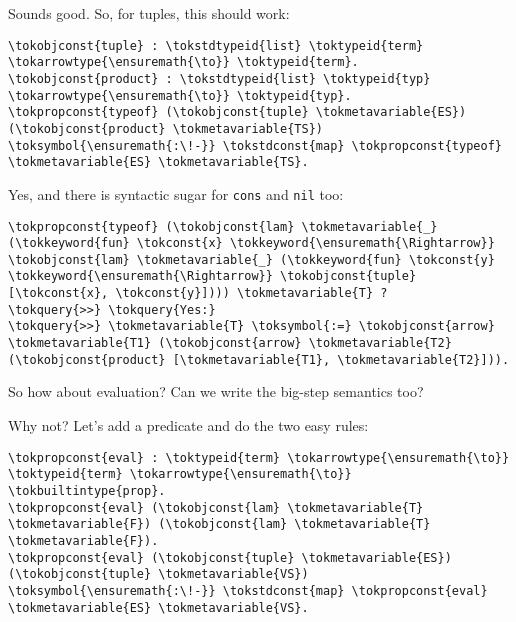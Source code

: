 \heroSTUDENT{} Sounds good. So, for tuples, this should work:

\importantCodeblock{}

\begin{verbatim}
\tokobjconst{tuple} : \tokstdtypeid{list} \toktypeid{term} \tokarrowtype{\ensuremath{\to}} \toktypeid{term}.
\tokobjconst{product} : \tokstdtypeid{list} \toktypeid{typ} \tokarrowtype{\ensuremath{\to}} \toktypeid{typ}.
\tokpropconst{typeof} (\tokobjconst{tuple} \tokmetavariable{ES}) (\tokobjconst{product} \tokmetavariable{TS}) \toksymbol{\ensuremath{:\!-}} \tokstdconst{map} \tokpropconst{typeof} \tokmetavariable{ES} \tokmetavariable{TS}.
\end{verbatim}

\importantCodeblockEnd{}

\heroADVISOR{} Yes, and there is syntactic sugar for \texttt{cons} and
\texttt{nil} too:

\begin{verbatim}
\tokpropconst{typeof} (\tokobjconst{lam} \tokmetavariable{_} (\tokkeyword{fun} \tokconst{x} \tokkeyword{\ensuremath{\Rightarrow}} \tokobjconst{lam} \tokmetavariable{_} (\tokkeyword{fun} \tokconst{y} \tokkeyword{\ensuremath{\Rightarrow}} \tokobjconst{tuple} [\tokconst{x}, \tokconst{y}]))) \tokmetavariable{T} ?
\tokquery{>>} \tokquery{Yes:}
\tokquery{>>} \tokmetavariable{T} \toksymbol{:=} \tokobjconst{arrow} \tokmetavariable{T1} (\tokobjconst{arrow} \tokmetavariable{T2} (\tokobjconst{product} [\tokmetavariable{T1}, \tokmetavariable{T2}])).
\end{verbatim}

\heroSTUDENT{} So how about evaluation? Can we write the big-step semantics
too?

\heroADVISOR{} Why not? Let's add a predicate and do the two easy rules:

\importantCodeblock{}

\begin{verbatim}
\tokpropconst{eval} : \toktypeid{term} \tokarrowtype{\ensuremath{\to}} \toktypeid{term} \tokarrowtype{\ensuremath{\to}} \tokbuiltintype{prop}.
\tokpropconst{eval} (\tokobjconst{lam} \tokmetavariable{T} \tokmetavariable{F}) (\tokobjconst{lam} \tokmetavariable{T} \tokmetavariable{F}).
\tokpropconst{eval} (\tokobjconst{tuple} \tokmetavariable{ES}) (\tokobjconst{tuple} \tokmetavariable{VS}) \toksymbol{\ensuremath{:\!-}} \tokstdconst{map} \tokpropconst{eval} \tokmetavariable{ES} \tokmetavariable{VS}.
\end{verbatim}

